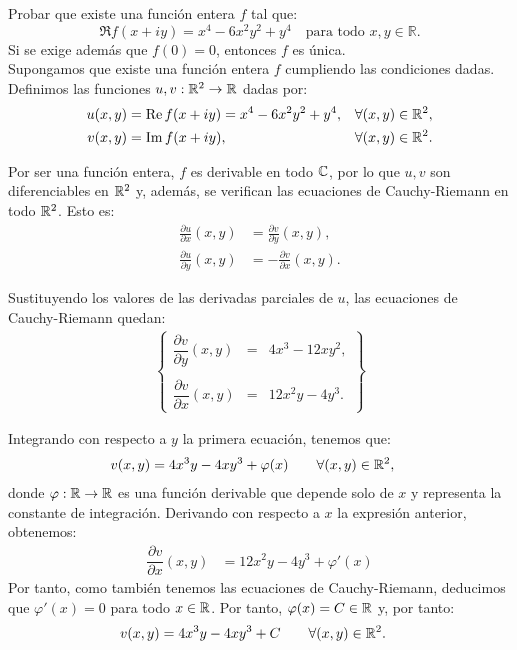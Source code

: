 \begin{ejercicio}
    Probar que existe una función entera $f$ tal que:
    \[
        \Re f(x + iy) = x^4 - 6x^2y^2 + y^4 \quad \text{para todo } x, y \in \mathbb{R}.
    \]
    Si se exige además que $f(0) = 0$, entonces $f$ es única.\\

    Supongamos que existe una función entera $f$ cumpliendo las condiciones dadas.
    Definimos las funciones $u,v:\mathbb{R}^2\to\mathbb{R}$ dadas por:
    \begin{align*}
        u(x,y) &= \operatorname{Re} f(x+iy) = x^4 - 6x^2y^2 + y^4,&\forall (x,y)\in\mathbb{R}^2,\\
        v(x,y) &= \operatorname{Im} f(x+iy),&\forall (x,y)\in\mathbb{R}^2.
    \end{align*}

    Por ser una función entera, $f$ es derivable en todo $\mathbb{C}$, por lo que $u,v$ son diferenciables en $\mathbb{R}^2$ y, además, se verifican las ecuaciones de Cauchy-Riemann en todo $\mathbb{R}^2$. Esto es:
    \begin{align*}
        \frac{\partial u}{\partial x}(x,y) &= \frac{\partial v}{\partial y}(x,y),\\
        \frac{\partial u}{\partial y}(x,y) &= -\frac{\partial v}{\partial x}(x,y).
    \end{align*}

    Sustituyendo los valores de las derivadas parciales de $u$, las ecuaciones de Cauchy-Riemann quedan:
    \begin{align*}
        \left\{
            \begin{array}{rcl}
                \dfrac{\partial v}{\partial y}(x,y) &=& 4x^3-12xy^2,\\ \\
                \dfrac{\partial v}{\partial x}(x,y) &=& 12x^2y-4y^3.
            \end{array}
        \right\}
    \end{align*}

    Integrando con respecto a $y$ la primera ecuación, tenemos que:
    \begin{align*}
        v(x,y) &= 4x^3y -4xy^3 + \varphi(x)\qquad \forall (x,y)\in\mathbb{R}^2,
    \end{align*}
    donde $\varphi:\mathbb{R}\to\mathbb{R}$ es una función derivable que depende solo de $x$ y representa la constante de integración. Derivando con respecto a $x$ la expresión anterior, obtenemos:
    \begin{align*}
        \dfrac{\partial v}{\partial x}(x,y) &= 12x^2y - 4y^3 + \varphi'(x)
    \end{align*}
    Por tanto, como también tenemos las ecuaciones de Cauchy-Riemann, deducimos que $\varphi'(x)=0$ para todo $x\in\mathbb{R}$. Por tanto, $\varphi(x)=C\in\mathbb{R}$ y, por tanto:
    \begin{align*}
        v(x,y) &= 4x^3y -4xy^3 + C\qquad \forall (x,y)\in\mathbb{R}^2.
    \end{align*}


\end{ejercicio}

